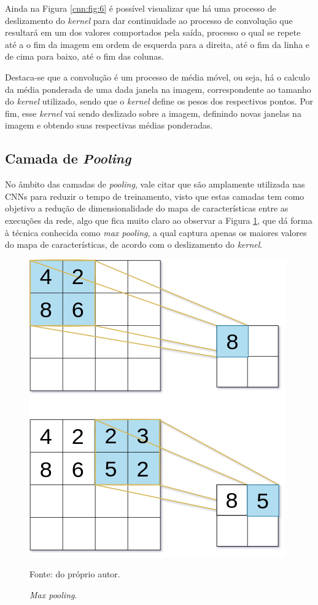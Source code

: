 Ainda na Figura \ref{cnn:fig:6} é possível visualizar que há uma processo de deslizamento do \textit{kernel} para dar continuidade ao processo de convolução que resultará em um dos valores comportados pela saída, processo o qual se repete até a o fim da imagem em ordem de esquerda para a direita, até o fim da linha e de cima para baixo, até o fim das colunas.

Destaca-se que a convolução é um processo de média móvel, ou seja, há o calculo da média ponderada de uma dada janela na imagem, correspondente ao tamanho do \textit{kernel} utilizado, sendo que o \textit{kernel} define os pesos dos respectivos pontos. Por fim, esse \textit{kernel} vai sendo deslizado sobre a imagem, definindo novas janelas na imagem e obtendo suas respectivas médias ponderadas.


\subsection{Camada de \textit{Pooling}}
\label{cnn:pooling}

No âmbito das camadas de \textit{pooling}, vale citar que são amplamente utilizada nas CNNs para reduzir o tempo de treinamento, visto que estas camadas tem como objetivo a redução de dimensionalidade do mapa de características entre as execuções da rede, algo que fica muito claro ao observar a Figura \ref{cnn:fig:7}, que dá forma à técnica conhecida como \textit{max pooling}, a qual captura apenas os maiores valores do mapa de características, de acordo com o deslizamento do \textit{kernel}.

\begin{figure}[H]
    \centering
    \caption{\textit{Max pooling}.}
    \includegraphics[width=0.5\linewidth]{recursos/imagens/deep/max_pooling.png}
    \label{cnn:fig:7}

    Fonte: do próprio autor.
\end{figure}

